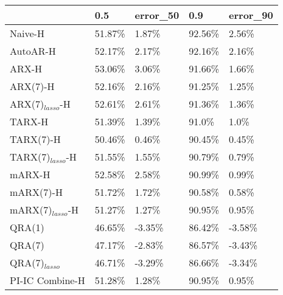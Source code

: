 \begin{tabular}{lllll}
\toprule
{} &     0.5 & error\_50 &     0.9 & error\_90 \\
\midrule
Naive-H           &  51.87\% &    1.87\% &  92.56\% &    2.56\% \\
AutoAR-H          &  52.17\% &    2.17\% &  92.16\% &    2.16\% \\
ARX-H             &  53.06\% &    3.06\% &  91.66\% &    1.66\% \\
ARX(7)-H          &  52.16\% &    2.16\% &  91.25\% &    1.25\% \\
ARX(7)$_{lasso}$-H  &  52.61\% &    2.61\% &  91.36\% &    1.36\% \\
TARX-H            &  51.39\% &    1.39\% &   91.0\% &     1.0\% \\
TARX(7)-H         &  50.46\% &    0.46\% &  90.45\% &    0.45\% \\
TARX(7)$_{lasso}$-H &  51.55\% &    1.55\% &  90.79\% &    0.79\% \\
mARX-H            &  52.58\% &    2.58\% &  90.99\% &    0.99\% \\
mARX(7)-H         &  51.72\% &    1.72\% &  90.58\% &    0.58\% \\
mARX(7)$_{lasso}$-H &  51.27\% &    1.27\% &  90.95\% &    0.95\% \\
QRA(1)            &  46.65\% &   -3.35\% &  86.42\% &   -3.58\% \\
QRA(7)            &  47.17\% &   -2.83\% &  86.57\% &   -3.43\% \\
QRA(7)$_{lasso}$    &  46.71\% &   -3.29\% &  86.66\% &   -3.34\% \\
PI-IC Combine-H   &  51.28\% &    1.28\% &  90.95\% &    0.95\% \\
\bottomrule
\end{tabular}
